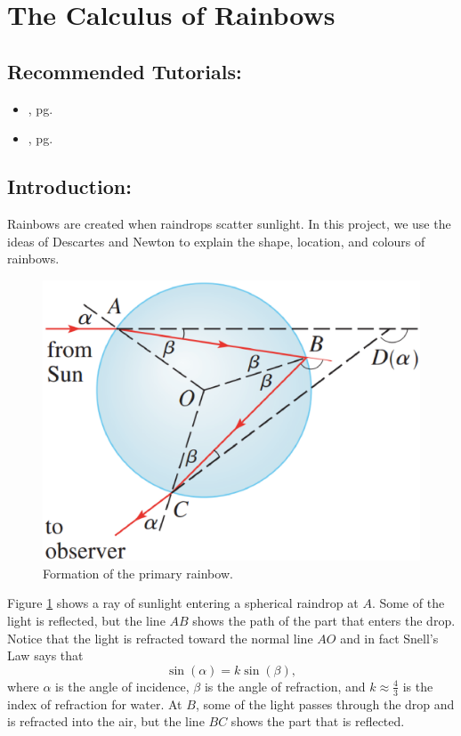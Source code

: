 \section{The Calculus of Rainbows}
\label{sec:rainbows}	

\subsection*{Recommended Tutorials:}
\begin{itemize}[noitemsep]
	\item {}, pg. \pageref{chp:equation_solvers}
	\item {}, pg. \pageref{chp:derivative}
\end{itemize}

\subsection*{Introduction:}

Rainbows are created when raindrops scatter sunlight. In this project, we use the ideas of Descartes and Newton to explain the shape, location, and colours of rainbows.

\begin{figure}[h]
	\centering
	\includegraphics[scale=0.35]{activities/math112/figures/Rainbow.eps}
	\caption{Formation of the primary rainbow.}
	\label{fig:rainbow1}
\end{figure}

Figure \ref{fig:rainbow1} shows a ray of sunlight entering a spherical raindrop at $A$. Some of the light is reflected, but the line $AB$ shows the path of the part that enters the drop. Notice that the light is refracted toward the normal line $AO$ and in fact Snell's Law says that 
\begin{equation}
\label{eq:snellslaw}
\sin(\alpha)=k\sin(\beta),
\end{equation}
where $\alpha$ is the angle of incidence, $\beta$ is the angle of refraction, and $k \approx \frac{4}{3}$ is the index of refraction for water. At $B$, some of the light passes through the drop and is refracted into the air, but the line $BC$ shows the part that is reflected. 

